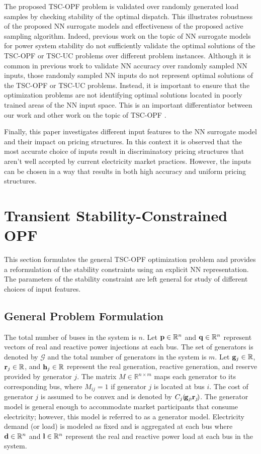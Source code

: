 \documentclass[lettersize,journal]{IEEEtran}
\begin{document}
The proposed TSC-OPF problem is validated over randomly generated load samples by checking stability of the optimal dispatch.  This illustrates robustness of the proposed NN surrogate models and effectiveness of the proposed active sampling algorithm.  Indeed, previous work on the topic of NN surrogate models for power system stability do not sufficiently validate the optimal solutions of the TSC-OPF or TSC-UC problems over different problem instances.  Although it is common in previous work to validate NN accuracy over randomly sampled NN inputs, those randomly sampled NN inputs do not represent optimal solutions of the TSC-OPF or TSC-UC problems.  Instead, it is important to ensure that the optimization problems are not identifying optimal solutions located in poorly trained areas of the NN input space.  This is an important differentiator between our work and other work on the topic of TSC-OPF \cite{ahmadi2013two,gutierrez2010neural}.  

Finally, this paper investigates different input features to the NN surrogate model and their impact on pricing structures.  In this context it is observed that the most accurate choice of inputs result in discriminatory pricing structures that aren't well accepted by current electricity market practices.  However, the inputs can be chosen in a way that results in both high accuracy and uniform pricing structures.


\section{Transient Stability-Constrained OPF}\label{SecII}
This section formulates the general TSC-OPF optimization problem and provides a reformulation of the stability constraints using an explicit NN representation.  The parameters of the stability constraint are left general for study of different choices of input features.

\subsection{General Problem Formulation}
The total number of buses in the system is $n$.  Let $\bold{p}\in\mathbb{R}^n$ and $\bold{q}\in\mathbb{R}^n$ represent vectors of real and reactive power injections at each bus.  The set of generators is denoted by $\mathcal{G}$ and the total number of generators in the system is $m$.  Let $\bold{g}_j\in\mathbb{R}$, $\bold{r}_{j}\in\mathbb{R}$, and $\bold{h}_{j}\in\mathbb{R}$ represent the real generation, reactive generation, and reserve provided by generator $j$.  The matrix $M\in\mathbb{R}^{n\times m}$ maps each generator to its corresponding bus, where $M_{ij}=1$ if generator $j$ is located at bus $i$.   The cost of generator $j$ is assumed to be convex and is denoted by $C_j(\!\bold{g}_{j}\!,\!\bold{r}_{j}\!)$.  The generator model is general enough to accommodate market participants that consume electricity; however, this model is referred to as a generator model.  Electricity demand (or load) is modeled as fixed and is aggregated at each bus where $\bold{d}\in\mathbb{R}^n$ and $\bold{l}\in\mathbb{R}^n$ represent the real and reactive power load at each bus in the system.
\end{document}
